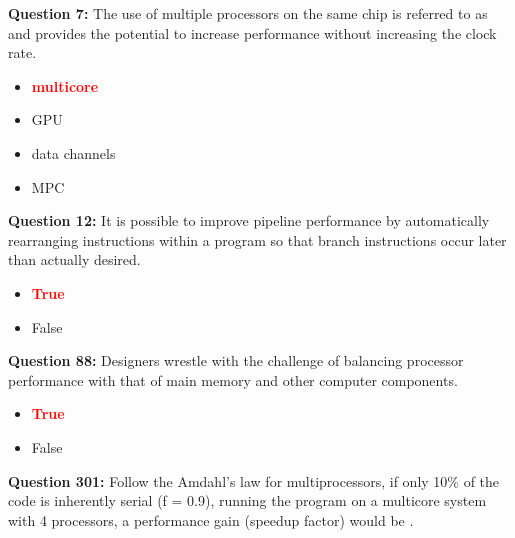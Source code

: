 \documentclass[12pt,a4paper]{article}
\begin{document}
\textbf{Question 7:} The use of multiple processors on the same chip is referred to as \underline{\hspace{1.5cm}} and provides the potential to increase performance without increasing the clock rate.

\begin{itemize}
    \item[\textbf{A.}] \textcolor{red}{\textbf{multicore}}
    \item[\textbf{B.}] GPU
    \item[\textbf{C.}] data channels
    \item[\textbf{D.}] MPC
\end{itemize}

\vspace{0.5cm}

\vspace{0.5cm}

\textbf{Question 12:} It is possible to improve pipeline performance by automatically rearranging instructions within a program so that branch instructions occur later than actually desired.

\begin{itemize}
    \item[\textbf{A.}] \textcolor{red}{\textbf{True}}
    \item[\textbf{B.}] False
\end{itemize}

\vspace{0.5cm}

\vspace{0.5cm}

\textbf{Question 88:} Designers wrestle with the challenge of balancing processor performance with that of main memory and other computer components.

\begin{itemize}
    \item[\textbf{A.}] \textcolor{red}{\textbf{True}}
    \item[\textbf{B.}] False
\end{itemize}

\vspace{0.5cm}

\vspace{0.5cm}

\textbf{Question 301:} Follow the Amdahl's law for multiprocessors, if only 10\% of the code is inherently serial (f = 0.9), running the program on a multicore system with 4 processors, a performance gain (speedup factor) would be \underline{\hspace{1.5cm}}.
\end{document}

